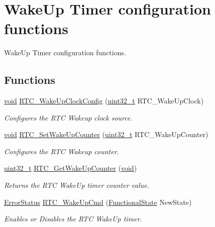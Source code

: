 \hypertarget{group___r_t_c___group4}{\section{Wake\-Up Timer configuration functions}
\label{group___r_t_c___group4}
}


Wake\-Up Timer configuration functions.  


\subsection*{Functions}
\begin{DoxyCompactItemize}
\item 
\hyperlink{group___n_a_m_e_ga18028b8badbf1ea7e704ccac3c488e82}{void} \hyperlink{group___r_t_c___group4_ga2557b02b318211112731a91a190c4b26}{R\-T\-C\-\_\-\-Wake\-Up\-Clock\-Config} (\hyperlink{stdint_8h_a435d1572bf3f880d55459d9805097f62}{uint32\-\_\-t} R\-T\-C\-\_\-\-Wake\-Up\-Clock)
\begin{DoxyCompactList}\small\item\em Configures the R\-T\-C Wakeup clock source. \end{DoxyCompactList}\item 
\hyperlink{group___n_a_m_e_ga18028b8badbf1ea7e704ccac3c488e82}{void} \hyperlink{group___r_t_c___group4_ga1412044eb756a166c1cf341f3d46ed6b}{R\-T\-C\-\_\-\-Set\-Wake\-Up\-Counter} (\hyperlink{stdint_8h_a435d1572bf3f880d55459d9805097f62}{uint32\-\_\-t} R\-T\-C\-\_\-\-Wake\-Up\-Counter)
\begin{DoxyCompactList}\small\item\em Configures the R\-T\-C Wakeup counter. \end{DoxyCompactList}\item 
\hyperlink{stdint_8h_a435d1572bf3f880d55459d9805097f62}{uint32\-\_\-t} \hyperlink{group___r_t_c___group4_gae63aab672e917cc48e298162c3dec049}{R\-T\-C\-\_\-\-Get\-Wake\-Up\-Counter} (\hyperlink{group___n_a_m_e_ga18028b8badbf1ea7e704ccac3c488e82}{void})
\begin{DoxyCompactList}\small\item\em Returns the R\-T\-C Wake\-Up timer counter value. \end{DoxyCompactList}\item 
\hyperlink{group___exported__types_ga8333b96c67f83cba354b3407fcbb6ee8}{Error\-Status} \hyperlink{group___r_t_c___group4_ga2ce05293303e0d7879c6d755c5355b4c}{R\-T\-C\-\_\-\-Wake\-Up\-Cmd} (\hyperlink{group___exported__types_gac9a7e9a35d2513ec15c3b537aaa4fba1}{Functional\-State} New\-State)
\begin{DoxyCompactList}\small\item\em Enables or Disables the R\-T\-C Wake\-Up timer. \end{DoxyCompactList}\end{DoxyCompactItemize}


